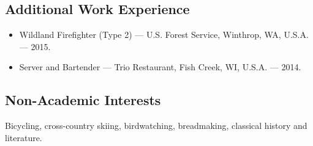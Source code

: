 \subsection*{\textbf{Additional Work Experience}}

\begin{itemize}[label={}]
	\item Wildland Firefighter (Type 2) --- U.S. Forest Service, Winthrop, WA, U.S.A. --- 2015.
	\item Server and Bartender --- Trio Restaurant, Fish Creek, WI, U.S.A. --- 2014.
\end{itemize}

\subsection*{\textbf{Non-Academic Interests}}
	\hspace{5ex}
 	Bicycling, cross-country skiing, birdwatching, breadmaking, classical history and literature.